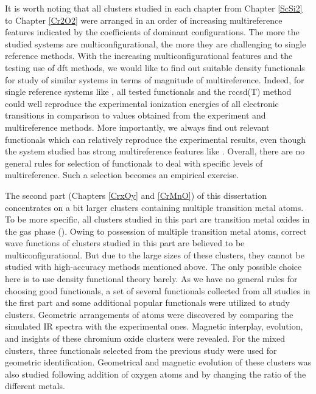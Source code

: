 It is worth noting that all clusters studied in each chapter from Chapter \ref{ScSi2} to Chapter \ref{Cr2O2} were arranged in an order of increasing multireference features indicated by the coefficients of dominant configurations. The more the studied systems are multiconfigurational, the more they are challenging to single reference methods. With the increasing multiconfigurational features and the testing use of \acrshort{dft} methods, we would like to find out suitable density functionals for study of similar systems in terms of magnitude of multireference. Indeed, for single reference systems like , all tested functionals and the \acrshort{rccsd}(T) method could well reproduce the experimental ionization energies of all electronic transitions in comparison to values obtained from the experiment and multireference methods. More importantly, we always find out relevant functionals which can relatively reproduce the experimental results, even though the system studied has strong multireference features like . Overall, there are no general rules for selection of functionals to deal with specific levels of multireference. Such a selection becomes an empirical exercise. 




The second part (Chapters \ref{CrxOy} and \ref{CrMnO}) of this dissertation concentrates on a bit larger clusters containing multiple transition metal atoms. To be more specific, all clusters studied in this part are transition metal oxides in the gas phase (). Owing to possession of multiple transition metal atoms, correct wave functions of clusters studied in this part are believed to be multiconfigurational. But due to the large sizes of these clusters, they cannot be studied with high-accuracy methods mentioned above. The only possible choice here is to use density functional theory barely. As we have no general rules for choosing good functionals, a set of several functionals collected from all studies in the first part and some additional popular functionals were utilized to study  clusters. Geometric arrangements of atoms were discovered by comparing the simulated IR spectra with the experimental ones. Magnetic interplay, evolution, and insights of these chromium oxide clusters were revealed. For the mixed  clusters, three functionals selected from the previous study were used for geometric identification. Geometrical and magnetic evolution of these clusters was also studied following addition of oxygen atoms and by changing the ratio of the different metals. 






\cleardoublepage


